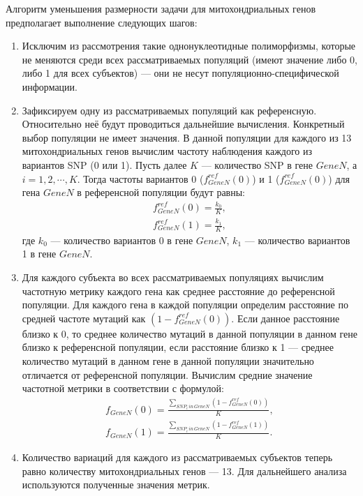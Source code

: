 Алгоритм уменьшения размерности задачи для митохондриальных генов предполагает выполнение следующих шагов:
\begin{enumerate}
	\item Исключим из рассмотрения такие однонуклеотидные полиморфизмы, которые не меняются среди всех рассматриваемых популяций (имеют значение либо 0, либо 1 для всех субъектов) --- они не несут популяционно-специфической информации.
	\item Зафиксируем одну из рассматриваемых популяций как референсную. Относительно неё будут проводиться дальнейшие вычисления. Конкретный выбор популяции не имеет значения. В данной популяции для каждого из 13 митохондриальных генов вычислим частоту наблюдения каждого из вариантов SNP (0 или 1). Пусть далее $K$ --- количество SNP в гене $Gene N$, а $i = 1, 2, \cdots, K$. Тогда частоты вариантов 0 ($f_{Gene N}^{ref} (0)$) и 1 ($f_{Gene N}^{ref} (0)$) для гена $Gene N$ в референсной популяции будут равны:
	\begin{equation}
	\label{eq:f_ref_mt}
	\begin{gathered}
	f_{Gene N}^{ref} (0) = \frac{k_0}{K},\\
	f_{Gene N}^{ref} (1) = \frac{k_1}{K},
	\end{gathered}
	\end{equation}
	где $k_0$ --- количество вариантов 0 в гене $Gene N$, $k_1$ --- количество вариантов 1 в гене $Gene N$.
	\item Для каждого субъекта во всех рассматриваемых популяциях вычислим частотную метрику каждого гена как среднее расстояние до референсной популяции. Для каждого гена в каждой популяции определим расстояние по средней частоте мутаций как $\left(1 - f_{Gene N}^{ref} (0)\right)$. Если данное расстояние близко к 0, то среднее количество мутаций в данной популяции в данном гене близко к референсной популяции, если расстояние близко к 1 --- среднее количество мутаций в данном гене в данной популяции значительно отличается от референсной популяции. Вычислим средние значение частотной метрики в соответствии с формулой:
	\begin{equation}
	\label{eq:f_mt}
		\begin{gathered}
		f_{Gene N} (0) = \frac{\sum_{SNP_i\,in\,Gene N} \left(1 - f_{Gene N}^{ref} (0)\right)}{K},\\
		f_{Gene N} (1) = \frac{\sum_{SNP_i\,in\,Gene N} \left(1 - f_{Gene N}^{ref} (1)\right)}{K}.
		\end{gathered}
	\end{equation}
	\item Количество вариаций для каждого из рассматриваемых субъектов теперь равно количеству митохондриальных генов --- 13. Для дальнейшего анализа используются полученные значения метрик.
\end{enumerate}

